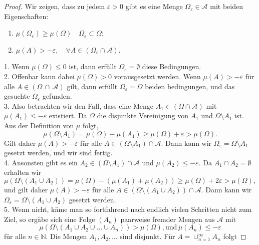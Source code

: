 \documentclass[/Users/zhangwusheng/Documents/satz von radon nikodym/satz von radon nikodym.tex]{subfiles}
\begin{document}
    \begin{proof}
        Wir zeigen, dass zu jedem $\varepsilon >0$ gibt es eine Menge $\Omega_{\varepsilon} \in \mathcal{A}$
        mit beiden Eigenschaften:
        \begin{enumerate}[label=(\roman*)]
            \item $\mu(\Omega_{\varepsilon}) \geq \mu(\Omega) \quad \Omega_{\varepsilon} \subset \Omega$;
            \item $\mu(A) > -\varepsilon, \quad \forall A \in (\Omega_{\varepsilon} \cap \mathcal{A})$.
        \end{enumerate} 
        1. Wenn $\mu(\Omega) \leq 0$ ist, dann erfüllt $\Omega_{\varepsilon} = \emptyset$ diese Bedingungen.\\ 
        2. Offenbar kann dabei $\mu(\Omega) > 0$ vorausgesetzt werden. Wenn $\mu(A) > -\varepsilon$ für alle $A \in (\Omega\, \cap\, \mathcal{A})$ gilt, 
        dann erfüllt $\Omega_{\varepsilon} = \Omega$ beiden bedingungen, und das gesuchte $\Omega_{\varepsilon}$ gefunden.\\
        3. Also betrachten wir den Fall, dass eine Menge $A_1 \in (\Omega \cap \mathcal{A})$ mit $\mu(A_1) \leq - \varepsilon$ existiert.
        Da $\Omega$ die disjunkte Vereinigung von $A_1$ und $\Omega \setminus A_1$ ist. Aus der Definition von $\mu$ folgt, 
        \[\mu(\Omega \setminus A_1) = \mu(\Omega) - \mu(A_1) \geq \mu(\Omega) + \varepsilon > \mu(\Omega).\]
        Gilt daher $\mu(A) > - \varepsilon$ für alle $A \in (\Omega \setminus A_1) \cap \mathcal{A}$. Dann kann wir $\Omega_{\varepsilon} = \Omega \setminus A_1$ 
        gesetzt werden, und wir sind fertig.\\
        4. Ansonsten gibt es ein $A_2 \in (\Omega \setminus A_1) \cap \mathcal{A}$ und $\mu(A_2) \leq -\varepsilon$. Da $A_1 \cap A_2 = \emptyset$ erhalten wir
        \[\mu(\Omega \setminus (A_1 \cup A_2))= \mu(\Omega) - (\mu(A_1) + \mu(A_2)) \geq \mu(\Omega) + 2\varepsilon > \mu(\Omega),\]
        und gilt daher $\mu(A) > - \varepsilon$ für alle $A \in (\Omega \setminus (A_1 \cup A_2)) \cap \mathcal{A}$. Dann kann wir $\Omega_{\varepsilon} = \Omega \setminus 
        (A_1 \cup A_2)$ gesetzt werden.\\ 
        5. Wenn nicht, käme man so fortfahrend nach endlich vielen Schritten nicht zum Ziel, so ergäbe sich eine Folge $(A_n)$ paarweise fremder Mengen aus $\mathcal{A}$ mit 
        \[\mu(\Omega \setminus (A_1 \cup A_2 \cup \ldots \cup A_n)) > \mu(\Omega), \text{und}\, \mu(A_n) \leq - \varepsilon\]
        für alle $n \in \mathbb{N}$. Die Mengen $A_1, A_2, \ldots$ sind disjunkt. Für $A= \cup_{n=1}^\infty A_n$ folgt

\end{proof}
\end{document}
